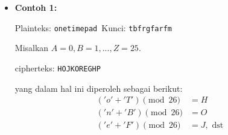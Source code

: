 \documentclass{article}
\begin{document}

\begin{itemize}
    \item \textbf{Contoh 1:}

    Plainteks: \texttt{onetimepad}\
    Kunci: \texttt{tbfrgfarfm}

    Misalkan $A = 0, B = 1, ..., Z = 25$.

    cipherteks: \texttt{HOJKOREGHP}

    yang dalam hal ini diperoleh sebagai berikut:
    \[
    \begin{aligned}
    ('o' + 'T') \pmod{26} &= H \\
    ('n' + 'B') \pmod{26} &= O \\
    ('e' + 'F') \pmod{26} &= J, \text{ dst}
    \end{aligned}
    \]
\end{itemize}
\end{document}
